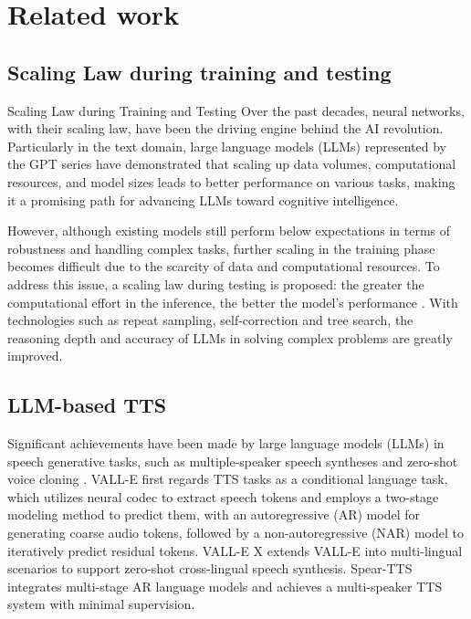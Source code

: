 \section{Related work}
\vspace{-5pt}
\subsection{Scaling Law during training and testing}
\vspace{-5pt}
Scaling Law during Training and Testing
Over the past decades, neural networks, with their scaling law, have been the driving engine behind the AI revolution. Particularly in the text domain, large language models (LLMs) represented by the GPT series have demonstrated that scaling up data volumes, computational resources, and model sizes leads to better performance on various tasks, making it a promising path for advancing LLMs toward cognitive intelligence.

However, although existing models still perform below expectations in terms of robustness and handling complex tasks, further scaling in the training phase becomes difficult due to the scarcity of data and computational resources. To address this issue, a scaling law during testing is proposed: the greater the computational effort in the inference, the better the model’s performance \cite{ji2025test}. With technologies such as repeat sampling, self-correction and tree search, the reasoning depth and accuracy of LLMs in solving complex problems are greatly improved.

\vspace{-10pt}
\subsection{LLM-based TTS}
\vspace{-5pt}
Significant achievements have been made by large language models (LLMs) in speech generative tasks, such as multiple-speaker speech syntheses \cite{speartts} and zero-shot voice cloning \cite{wang2023neural,chen2024vall}. VALL-E \cite{wang2023neural} first regards TTS tasks as a conditional language task, which utilizes neural codec to extract speech tokens and employs a two-stage modeling method to predict them, with an autoregressive (AR) model for generating coarse audio tokens, followed by a non-autoregressive (NAR) model to iteratively predict residual tokens. VALL-E X \cite{vallex} extends VALL-E into multi-lingual scenarios to support zero-shot cross-lingual speech synthesis. Spear-TTS \cite{speartts} integrates multi-stage AR language models and achieves a multi-speaker TTS system with minimal supervision.

